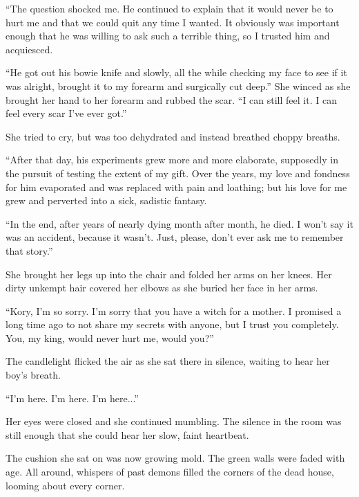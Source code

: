 ``The question shocked me. He continued to explain that it would never be to hurt me and that we could quit any time I wanted. It obviously was important enough that he was willing to ask such a terrible thing, so I trusted him and acquiesced.

``He got out his bowie knife and slowly, all the while checking my face to see if it was alright, brought it to my forearm and surgically cut deep.'' She winced as she brought her hand to her forearm and rubbed the scar. ``I can still feel it. I can feel every scar I've ever got.''

She tried to cry, but was too dehydrated and instead breathed choppy breaths.

``After that day, his experiments grew more and more elaborate, supposedly in the pursuit of testing the extent of my gift. Over the years, my love and fondness for him evaporated and was replaced with pain and loathing; but his love for me grew and perverted into a sick, sadistic fantasy.

``In the end, after years of nearly dying month after month, he died. I won't say it was an accident, because it wasn't. Just, please, don't ever ask me to remember that story.''

She brought her legs up into the chair and folded her arms on her knees. Her dirty unkempt hair covered her elbows as she buried her face in her arms.

``Kory, I'm so sorry. I'm sorry that you have a witch for a mother. I promised a long time ago to not share my secrets with anyone, but I trust you completely. You, my king, would never hurt me, would you?''

The candlelight flicked the air as she sat there in silence, waiting to hear her boy's breath.

\line



``I'm here. I'm here. I'm here...''

Her eyes were closed and she continued mumbling. The silence in the room was still enough that she could hear her slow, faint heartbeat.

The cushion she sat on was now growing mold. The green walls were faded with age. All around, whispers of past demons filled the corners of the dead house, looming about every corner.

